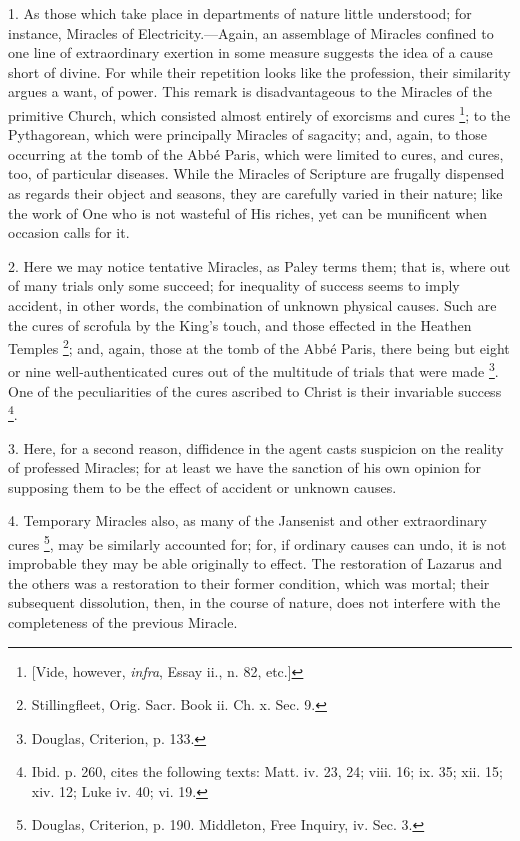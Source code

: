 1. As those which take place in departments of
nature little understood; for instance, Miracles of
Electricity.—Again, an assemblage of Miracles confined to one line
of extraordinary exertion in some measure suggests the idea of a cause
short of divine. For while their repetition looks like the profession,
their similarity argues a want, of power. This remark is
disadvantageous to the Miracles of the primitive Church, which
consisted almost entirely of exorcisms and cures \footnote{[Vide, however, \emph{infra}, Essay ii., n. 82, etc.]}; to the Pythagorean, which were principally Miracles of
sagacity; and, again, to those occurring at the tomb of the Abbé
Paris, which were limited to cures, and cures, too, of particular
diseases. While the Miracles of Scripture are frugally dispensed as
regards their object and seasons, they are carefully varied in their
nature; like the work of One who is not wasteful of His riches, yet
can be munificent when occasion calls for it.

2. Here we may notice tentative Miracles, as
Paley terms them; that is, where out of many trials only some succeed;
for inequality of success seems to imply accident, in other words, the
combination of unknown physical causes. Such are the cures of scrofula
by the King's touch, and those effected in the Heathen Temples \footnote{Stillingfleet, Orig. Sacr. Book ii. Ch. x. Sec. 9.}; and, again, those at the tomb of the Abbé Paris, there being
but eight or nine well-authenticated cures out of the multitude of
trials that were made \footnote{Douglas, Criterion, p. 133.}.
One of the peculiarities of the cures ascribed to Christ is their
invariable success \footnote{Ibid. p. 260, cites the following texts: Matt. iv. 23, 24; viii. 16;
ix. 35; xii. 15; xiv. 12; Luke iv. 40; vi. 19.}.

3. Here, for a second reason, diffidence in the
agent casts suspicion on the reality of professed Miracles; for at
least we have the sanction of his own opinion for supposing them to be
the effect of accident or unknown causes.

4. Temporary Miracles also, as many of the
Jansenist and other extraordinary cures \footnote{Douglas, Criterion, p. 190. Middleton, Free Inquiry, iv. Sec. 3.}, may be similarly accounted for; for, if ordinary causes can
undo, it is not improbable they may be able originally to effect. The
restoration of Lazarus and the others was a restoration to their
former condition, which was mortal; their subsequent dissolution,
then, in the course of nature, does not interfere with the
completeness of the previous Miracle.

